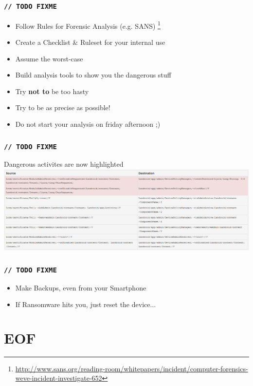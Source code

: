 \documentclass[12pt,a4paper]{beamer}
\begin{document}
\begin{frame}
\frametitle{\texttt{// TODO FIXME}}
\begin{itemize}
	\item Follow Rules for Forensic Analysis (e.g. SANS) \footnote{\url{http://www.sans.org/reading-room/whitepapers/incident/computer-forensics-weve-incident-investigate-652}}
	\item Create a Checklist \& Ruleset for your internal use
	\item Assume the worst-case
	\item Build analysis tools to show you the dangerous stuff
	\item Try \textbf{not to} be too hasty
	\item Try to be as precise as possible!
	\item Do not start your analysis on friday afternoon ;)
\end{itemize}
\end{frame}

\begin{frame}
\frametitle{\texttt{// TODO FIXME}}
Dangerous activites are now highlighted
\includegraphics[width=\textwidth]{images/device-admin-analysis.png}


\end{frame}

\begin{frame}
\frametitle{\texttt{// TODO FIXME}}

\begin{itemize}
	\item Make Backups, even from your Smartphone
	\item If Ransomware hits you, just reset the device...
\end{itemize}

\end{frame}



\section{EOF}
\end{document}

